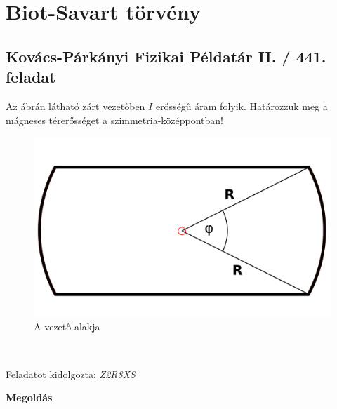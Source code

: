 \documentclass[11pt,a4paper,openany,leqno]{article}
\begin{document}
\section{Biot-Savart törvény}
\subsection{Kovács-Párkányi Fizikai Példatár II. / 441. feladat}


Az ábrán látható zárt vezetőben $I$ erősségű áram folyik. Határozzuk meg a mágneses térerősséget a szimmetria-középpontban!
\begin{figure}[h!]
\centering
  \includegraphics[width=120mm,scale=0.5]{abra.pdf}
  \caption{A vezető alakja}
  \label{}
\end{figure} \\ \indent
\indent

\begin{flushright} {Feladatot kidolgozta: {\it Z2R8XS}} \end{flushright}

\vspace{0.5cm}

\textbf{Megoldás}
\end{document}
